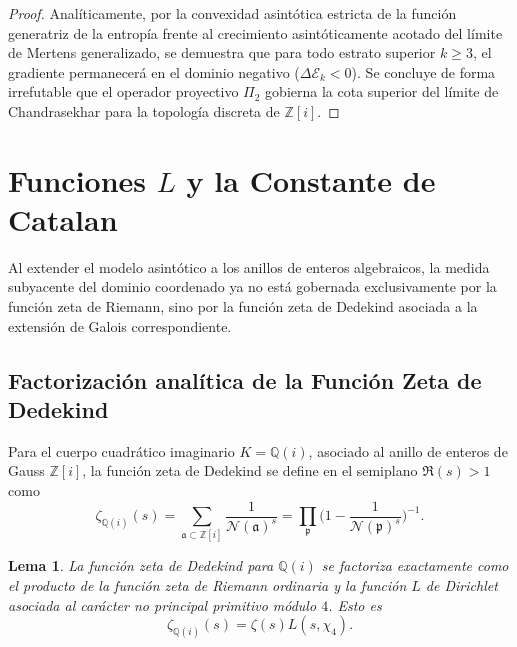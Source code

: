 \documentclass{article}
\numberwithin{equation}{section}
\theoremstyle{plain}
\newtheorem{lema}[teorema]{Lema}
\theoremstyle{definition}
\begin{document}
\begin{proof}
Analíticamente, por la convexidad asintótica estricta de la función generatriz de la entropía frente al crecimiento asintóticamente acotado del límite de Mertens generalizado, se demuestra que para todo estrato superior $k \ge 3$, el gradiente permanecerá en el dominio negativo ($\Delta \mathcal{E}_k < 0$). Se concluye de forma irrefutable que el operador proyectivo $\Pi_2$ gobierna la cota superior del límite de Chandrasekhar para la topología discreta de $\mathbb{Z}[i]$.
\end{proof}

\section{Funciones \texorpdfstring{$L$}{L} y la Constante de Catalan}
\label{sec:funciones_L}

Al extender el modelo asintótico a los anillos de enteros algebraicos, la medida subyacente del dominio coordenado ya no está gobernada exclusivamente por la función zeta de Riemann, sino por la función zeta de Dedekind asociada a la extensión de Galois correspondiente.

\subsection{Factorización analítica de la Función Zeta de Dedekind}

Para el cuerpo cuadrático imaginario $K = \mathbb{Q}(i)$, asociado al anillo de enteros de Gauss $\mathbb{Z}[i]$, la función zeta de Dedekind se define en el semiplano $\Re(s) > 1$ como
\begin{equation}
    \zeta_{\mathbb{Q}(i)}(s) = \sum_{\mathfrak{a} \subset \mathbb{Z}[i]} \frac{1}{\mathcal{N}(\mathfrak{a})^s} = \prod_{\mathfrak{p}} \bigg( 1 - \frac{1}{\mathcal{N}(\mathfrak{p})^s} \bigg)^{-1}.
\end{equation}

\begin{lema}
La función zeta de Dedekind para $\mathbb{Q}(i)$ se factoriza exactamente como el producto de la función zeta de Riemann ordinaria y la función $L$ de Dirichlet asociada al carácter no principal primitivo módulo $4$. Esto es
\begin{equation}
    \zeta_{\mathbb{Q}(i)}(s) = \zeta(s) L(s, \chi_4).
\end{equation}
\end{lema}
\end{document}
